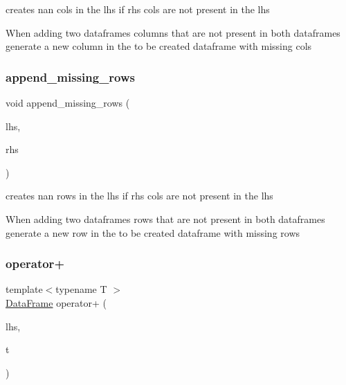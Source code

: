 creates nan cols in the lhs if rhs cols are not present in the lhs 

When adding two dataframes columns that are not present in both dataframes generate a new column in the to be created dataframe with missing cols \mbox{\label{classDataFrame_a221d3063f94569b545fe4c3ae56597e8}} 
\subsubsection{\texorpdfstring{append\+\_\+missing\+\_\+rows}{append\_missing\_rows}}
{\footnotesize\ttfamily void append\+\_\+missing\+\_\+rows (\begin{DoxyParamCaption}\item[{\hyperlink{classDataFrame}{Data\+Frame} \&}]{lhs,  }\item[{const \hyperlink{classDataFrame}{Data\+Frame} \&}]{rhs }\end{DoxyParamCaption})\hspace{0.3cm}{\ttfamily [friend]}}



creates nan rows in the lhs if rhs cols are not present in the lhs 

When adding two dataframes rows that are not present in both dataframes generate a new row in the to be created dataframe with missing rows \mbox{\label{classDataFrame_af0bd28935e605ba646d407b02e0a5850}} 
\subsubsection{\texorpdfstring{operator+}{operator+}}
{\footnotesize\ttfamily template$<$typename T $>$ \\
\hyperlink{classDataFrame}{Data\+Frame} operator+ (\begin{DoxyParamCaption}\item[{const \hyperlink{classDataFrame}{Data\+Frame} \&}]{lhs,  }\item[{const T \&}]{t }\end{DoxyParamCaption})\hspace{0.3cm}{\ttfamily [friend]}}




